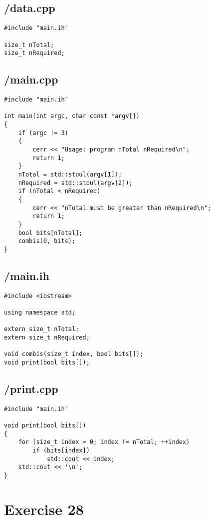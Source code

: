 \documentclass{article}
\begin{document}
\subsection*{/data.cpp}
\begin{verbatim}
#include "main.ih"

size_t nTotal;
size_t nRequired;

\end{verbatim}
\subsection*{/main.cpp}
\begin{verbatim}
#include "main.ih"

int main(int argc, char const *argv[])
{
    if (argc != 3)
    {
        cerr << "Usage: program nTotal nRequired\n";
        return 1;
    }
    nTotal = std::stoul(argv[1]);
    nRequired = std::stoul(argv[2]);
    if (nTotal < nRequired) 
    {
        cerr << "nTotal must be greater than nRequired\n";
        return 1;
    }
    bool bits[nTotal];
    combis(0, bits);
}

\end{verbatim}
\subsection*{/main.ih}
\begin{verbatim}
#include <iostream>

using namespace std;

extern size_t nTotal;
extern size_t nRequired;

void combis(size_t index, bool bits[]);
void print(bool bits[]);

\end{verbatim}
\subsection*{/print.cpp}
\begin{verbatim}
#include "main.ih"

void print(bool bits[])
{
    for (size_t index = 0; index != nTotal; ++index)
        if (bits[index])
            std::cout << index;
    std::cout << '\n';
}

\end{verbatim}

\section*{Exercise 28}
\end{document}
